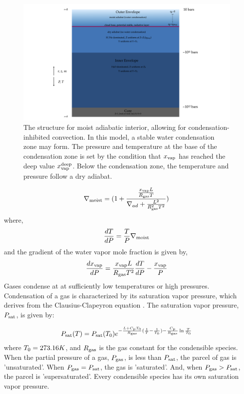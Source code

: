 \documentclass[11pt]{ucscthesisbs}
\begin{document}
\begin{figure}[ht!]
 \centerline{
  \includegraphics[width=8.0in]{figures/moist_adiabat_structure.png}
 }
\caption[Interior Structure for Moist Adiabat]
{The structure for moist adiabatic interior, allowing for condensation-inhibited convection. In this model, a stable water condensation zone may form. The pressure and temperature at the base of the condensation zone is set by the condition that $x_{\rm vap}$ has reached the deep value $x_{\rm vap}^{\rm deep}$. Below the condensation zone, the temperature and pressure follow a dry adiabat.}
\label{fig:moist_interior}
\end{figure}


\begin{equation}
\nabla_{\rm moist} = (1 + \frac{\frac{x_{\rm vap} L}{R_{\rm gas}T}}{\nabla_{ad} + \frac{L^2}{R_{\rm gas}^2 T^2}} )
\end{equation}
where,
\begin{equation}
\frac{dT}{dP} =\frac{T}{P}\nabla_{\rm moist}
\end{equation}
and the gradient of the water vapor mole fraction \citep{robinson_2016} is given by,
\begin{equation}
\frac{d x_{\rm vap}}{dP} = \frac{x_{\rm vap} L}{R_{\rm gas} T^2} \frac{dT}{dP} - \frac{x_{\rm vap}}{P}
\end{equation}
Gases condense at at sufficiently low temperatures or high pressures. Condensation of a gas is characterized by its saturation vapor pressure, which derives from the Clausius-Clapeyron equation \citep{sanchez_2011}. The saturation vapor pressure, $P_{\rm sat}$, is given by: 

\begin{equation}
  P_{\rm sat}(T) = P_{\rm sat}(T_{\rm 0})e^{-\frac{L + C_{\rm p}T_{\rm 0}}{R_{\rm gas}}(\frac{1}{T} - \frac{1}{T_{\rm 0}}) -\frac{C_{\rm p}}{R_{\rm gas}}\ln{\frac{T}{T_{\rm 0}}}}
  \label{eq:saturation_vapor_pressure}
\end{equation}
where $T_{\rm 0} = 273.16K$, and $R_{\rm gas}$ is the gas constant for the condensible species. When the partial pressure of a gas, $P_{\rm gas}$, is less than $P_{\rm sat}$, the parcel of gas is 'unsaturated'. When $P_{\rm gas} = P_{\rm sat}$, the gas is 'saturated'. And, when $P_{\rm gas} > P_{\rm sat}$, the parcel is 'supersaturated'. Every condensible species has its own saturation vapor pressure. 
\end{document}
